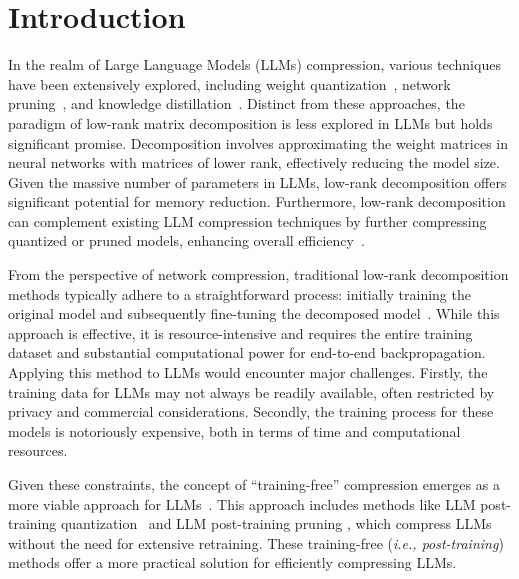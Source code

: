 \vspace{-0.1in}
\section{Introduction}



In the realm of Large Language Models (LLMs) compression, various techniques have been extensively explored, including weight quantization~\citep{dettmers2022llm}, network pruning~\citep{frantar2023sparsegpt}, and knowledge distillation~\citep{agarwal2023gkd}. 
Distinct from these approaches, the paradigm of low-rank matrix decomposition is less explored in LLMs but holds significant promise. Decomposition involves approximating the weight matrices in neural networks with matrices of lower rank, effectively reducing the model size. Given the massive number of parameters in LLMs, low-rank decomposition offers significant potential for memory reduction. 
Furthermore, low-rank decomposition can complement existing LLM compression techniques by further compressing quantized or pruned models, enhancing overall efficiency~\citep{cheng2017survey}.


From the perspective of network compression, traditional low-rank decomposition methods typically adhere to a straightforward process: initially training the original model and subsequently fine-tuning the decomposed model~\citep{jaderberg2014speeding,khodak2021initialization,wang2021pufferfish,hsu2022language}. While this approach is effective, it is resource-intensive and requires the entire training dataset and substantial computational power for end-to-end backpropagation. Applying this method to LLMs would encounter major challenges. Firstly, the training data for LLMs may not always be readily available, often restricted by privacy and commercial considerations. Secondly, the training process for these models is notoriously expensive, both in terms of time and computational resources. 

Given these constraints, the concept of ``training-free'' compression emerges as a more viable approach for LLMs~\citep{zhu2023survey}. This approach includes methods like LLM post-training quantization~\citep{dettmers2022llm,yuan2023rptq} and LLM post-training pruning \citep{frantar2023sparsegpt}, which compress LLMs without the need for extensive retraining.
These training-free (\textit{i.e., post-training}) methods offer a more practical solution for efficiently compressing LLMs. 

